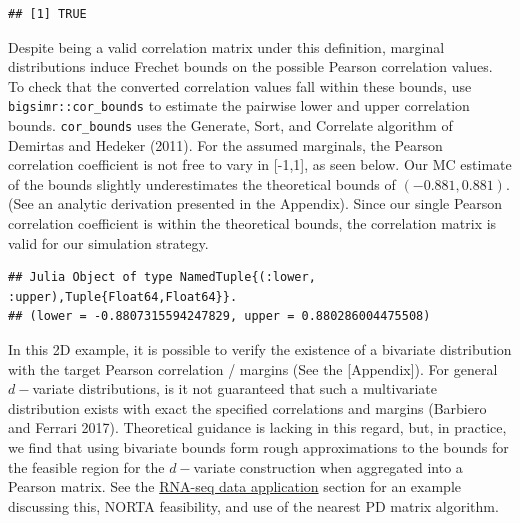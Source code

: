 \documentclass{article}
\newenvironment{Shaded}{\begin{snugshade}}{\end{snugshade}}
\newcommand{\AttributeTok}[1]{\textcolor[rgb]{0.77,0.63,0.00}{#1}}
\newcommand{\DecValTok}[1]{\textcolor[rgb]{0.00,0.00,0.81}{#1}}
\newcommand{\FloatTok}[1]{\textcolor[rgb]{0.00,0.00,0.81}{#1}}
\newcommand{\FunctionTok}[1]{\textcolor[rgb]{0.00,0.00,0.00}{#1}}
\newcommand{\NormalTok}[1]{#1}
\newcommand{\SpecialCharTok}[1]{\textcolor[rgb]{0.00,0.00,0.00}{#1}}
\begin{document}
\begin{verbatim}
## [1] TRUE
\end{verbatim}

Despite being a valid correlation matrix under this definition, marginal
distributions induce Frechet bounds on the possible Pearson correlation
values. To check that the converted correlation values fall within these
bounds, use \texttt{bigsimr::cor\_bounds} to estimate the pairwise lower
and upper correlation bounds. \texttt{cor\_bounds} uses the Generate,
Sort, and Correlate algorithm of Demirtas and Hedeker (2011). For the
assumed marginals, the Pearson correlation coefficient is not free to
vary in {[}-1,1{]}, as seen below. Our MC estimate of the bounds
slightly underestimates the theoretical bounds of \((-0.881, 0.881)\).
(See an analytic derivation presented in the Appendix). Since our single
Pearson correlation coefficient is within the theoretical bounds, the
correlation matrix is valid for our simulation strategy.

\begin{Shaded}
\end{Shaded}

\begin{verbatim}
## Julia Object of type NamedTuple{(:lower, :upper),Tuple{Float64,Float64}}.
## (lower = -0.8807315594247829, upper = 0.880286004475508)
\end{verbatim}

In this 2D example, it is possible to verify the existence of a
bivariate distribution with the target Pearson correlation / margins
(See the {[}Appendix{]}). For general \(d-\)variate distributions, is it
not guaranteed that such a multivariate distribution exists with exact
the specified correlations and margins (Barbiero and Ferrari 2017).
Theoretical guidance is lacking in this regard, but, in practice, we
find that using bivariate bounds form rough approximations to the bounds
for the feasible region for the \(d-\)variate construction when
aggregated into a Pearson matrix. See the
\protect\hyperlink{examples}{RNA-seq data application} section for an
example discussing this, NORTA feasibility, and use of the nearest PD
matrix algorithm.
\end{document}
